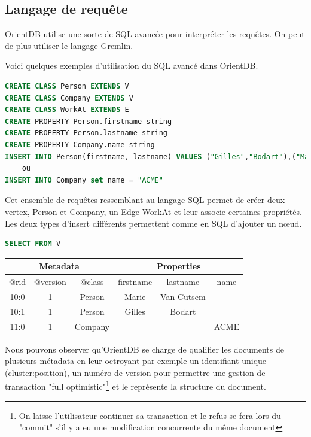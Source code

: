 \documentclass[a4paper,fleqn,12pt]{report}
\begin{document}
\subsection{Langage de requête}

OrientDB utilise une sorte de SQL avancée pour interpréter les requêtes. On peut de plus utiliser le langage Gremlin.

Voici quelques exemples d'utilisation du SQL avancé dans OrientDB.

\begin{lstlisting}[language=SQL]
CREATE CLASS Person EXTENDS V
CREATE CLASS Company EXTENDS V
CREATE CLASS WorkAt EXTENDS E
CREATE PROPERTY Person.firstname string
CREATE PROPERTY Person.lastname string
CREATE PROPERTY Company.name string
INSERT INTO Person(firstname, lastname) VALUES ("Gilles","Bodart"),("Marie","Van Cutsem")
	ou
INSERT INTO Company set name = "ACME"

\end{lstlisting}

Cet ensemble de requêtes ressemblant au langage SQL permet de créer deux vertex, Person et Company, un Edge WorkAt et leur associe certaines propriétés. Les deux types d’insert différents permettent comme en SQL d’ajouter un nœud.

\begin{lstlisting}[language=SQL]
SELECT FROM V
\end{lstlisting}
\begin{center}
	\begin{tabular}{|c|c|c|c|c|c|}
   		\hline
  		\multicolumn{3}{|c|}{Metadata} & \multicolumn{3}{c|}{Properties} \\
   		\hline
   		@rid & @version & @class & firstname & lastname & name \\
   		\hline
   		10:0 & 1 & Person & Marie & Van Cutsem &  \\
   		10:1 & 1 & Person & Gilles & Bodart &  \\
   		11:0 & 1 & Company &  &  & ACME \\
   		\hline
	\end{tabular}
\end{center}

Nous pouvons observer qu'OrientDB se charge de qualifier les documents de plusieurs métadata en leur octroyant par exemple un identifiant unique (\no cluster:position), un numéro de version pour permettre une gestion de transaction "full optimistic"\footnote{On laisse l'utilisateur continuer sa transaction et le refus se fera lors du "commit" s'il y a eu une modification concurrente du même document} et le \@class représente la structure du document.
\end{document}
